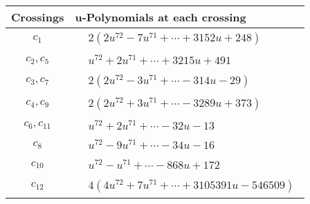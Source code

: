 \documentclass[1p]{elsarticle_modified}
\theoremstyle{definition}
\begin{document}
\begin{tabular}{m{50pt}|m{274pt}}
Crossings & \hspace{64pt}u-Polynomials at each crossing \\
\hline $$\begin{aligned}c_{1}\end{aligned}$$&$\begin{aligned}
&2(2 u^{72}-7 u^{71}+\cdots+3152 u+248)
\end{aligned}$\\
\hline $$\begin{aligned}c_{2},c_{5}\end{aligned}$$&$\begin{aligned}
&u^{72}+2 u^{71}+\cdots+3215 u+491
\end{aligned}$\\
\hline $$\begin{aligned}c_{3},c_{7}\end{aligned}$$&$\begin{aligned}
&2(2 u^{72}-3 u^{71}+\cdots-314 u-29)
\end{aligned}$\\
\hline $$\begin{aligned}c_{4},c_{9}\end{aligned}$$&$\begin{aligned}
&2(2 u^{72}+3 u^{71}+\cdots-3289 u+373)
\end{aligned}$\\
\hline $$\begin{aligned}c_{6},c_{11}\end{aligned}$$&$\begin{aligned}
&u^{72}+2 u^{71}+\cdots-32 u-13
\end{aligned}$\\
\hline $$\begin{aligned}c_{8}\end{aligned}$$&$\begin{aligned}
&u^{72}-9 u^{71}+\cdots-34 u-16
\end{aligned}$\\
\hline $$\begin{aligned}c_{10}\end{aligned}$$&$\begin{aligned}
&u^{72}- u^{71}+\cdots-868 u+172
\end{aligned}$\\
\hline $$\begin{aligned}c_{12}\end{aligned}$$&$\begin{aligned}
&4(4 u^{72}+7 u^{71}+\cdots+3105391 u-546509)
\end{aligned}$\\
\hline
\end{tabular}\\~\\
\end{document}
